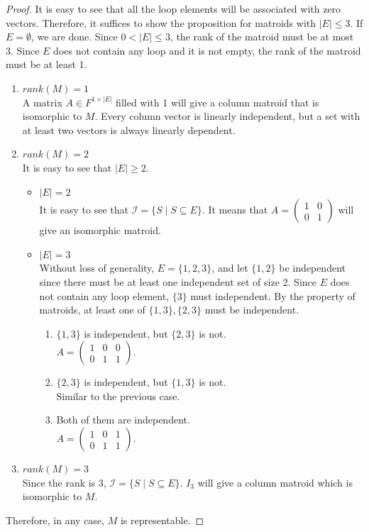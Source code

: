 \begin{proof}
It is easy to see that all the loop elements will be associated with zero vectors.
Therefore, it suffices to show the proposition for matroids with $\lvert E \rvert \leq 3$.
If $E = \emptyset$, we are done.
Since $0 < \lvert E \rvert \leq 3$, the rank of the matroid must be at most 3.
Since $E$ does not contain any loop and it is not empty, the rank of the matroid must be at least 1.
\begin{enumerate}
\item $rank(M) = 1$\\
A matrix $A \in F^{1 \times \lvert E \rvert}$ filled with 1 will give a column matroid that is isomorphic to $M$.
Every column vector is linearly independent, but a set with at least two vectors is always linearly dependent.
\item $rank(M) = 2$\\
It is easy to see that $\lvert E \rvert \geq 2$.
\begin{itemize}
\item $\lvert E \rvert = 2$\\
It is easy to see that $\mathcal{I} = \{ S \mid S \subseteq E \}$.
It means that $A = \begin{pmatrix} 1 & 0 \\ 0 & 1 \end{pmatrix}$ will give an isomorphic matroid.
\item $\lvert E \rvert = 3$\\
Without loss of generality, $E = \{ 1, 2, 3 \}$, and let $\{ 1, 2 \}$ be independent since there must be at least one independent set of size 2.
Since $E$ does not contain any loop element, $\{ 3 \}$ must independent.
By the property of matroids, at least one of $\{ 1, 3 \}, \{ 2, 3 \}$ must be independent.
\begin{enumerate}
\item $\{ 1, 3 \}$ is independent, but $\{2, 3\}$ is not.\\
  $A = \begin{pmatrix}
        1 & 0 & 0 \\
        0 & 1 & 1
        \end{pmatrix}$.
\item $\{ 2, 3 \}$ is independent, but $\{1, 3\}$ is not.\\
  Similar to the previous case.
\item Both of them are independent. \\
  $A = \begin{pmatrix}
        1 & 0 & 1 \\
        0 & 1 & 1
        \end{pmatrix}$.
\end{enumerate}
\end{itemize}
\item $rank(M) = 3$\\
Since the rank is 3, $\mathcal{I} = \{ S \mid S \subseteq E \}$. $I_3$ will give a column matroid which is isomorphic to $M$.
\end{enumerate}
Therefore, in any case, $M$ is representable.
\end{proof}


